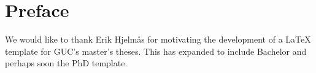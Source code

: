 \chapter*{Preface} %
\label{chap:preface}

We would like to thank Erik Hjelm\aa{}s for motivating the development of a \LaTeX{} template
 for GUC's master's theses.  This has expanded to include Bachelor and perhaps soon the PhD 
 template.
 
 